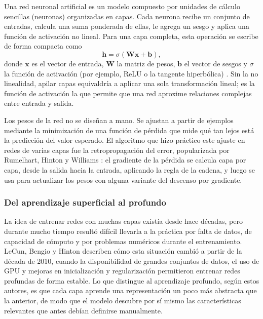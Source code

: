 Una red neuronal artificial es un modelo compuesto por unidades de cálculo sencillas (neuronas) organizadas en capas. Cada neurona recibe un conjunto de entradas, calcula una suma ponderada de ellas, le agrega un sesgo y aplica una función de activación no lineal. Para una capa completa, esta operación se escribe de forma compacta como
\begin{equation}
\mathbf{h} = \sigma(\mathbf{W}\mathbf{x} + \mathbf{b}),
\end{equation}
donde $\mathbf{x}$ es el vector de entrada, $\mathbf{W}$ la matriz de pesos, $\mathbf{b}$ el vector de sesgos y $\sigma$ la función de activación (por ejemplo, ReLU o la tangente hiperbólica) \cite{goodfellow2016deep}. Sin la no linealidad, apilar capas equivaldría a aplicar una sola transformación lineal; es la función de activación la que permite que una red aproxime relaciones complejas entre entrada y salida.

Los pesos de la red no se diseñan a mano. Se ajustan a partir de ejemplos mediante la minimización de una función de pérdida que mide qué tan lejos está la predicción del valor esperado. El algoritmo que hizo práctico este ajuste en redes de varias capas fue la retropropagación del error, popularizada por Rumelhart, Hinton y Williams \cite{rumelhart1986learning}: el gradiente de la pérdida se calcula capa por capa, desde la salida hacia la entrada, aplicando la regla de la cadena, y luego se usa para actualizar los pesos con alguna variante del descenso por gradiente.


\subsubsection{Del aprendizaje superficial al profundo}


La idea de entrenar redes con muchas capas existía desde hace décadas, pero durante mucho tiempo resultó difícil llevarla a la práctica por falta de datos, de capacidad de cómputo y por problemas numéricos durante el entrenamiento. LeCun, Bengio y Hinton \cite{lecun2015deep} describen cómo esta situación cambió a partir de la década de 2010, cuando la disponibilidad de grandes conjuntos de datos, el uso de GPU y mejoras en inicialización y regularización permitieron entrenar redes profundas de forma estable. Lo que distingue al aprendizaje profundo, según estos autores, es que cada capa aprende una representación un poco más abstracta que la anterior, de modo que el modelo descubre por sí mismo las características relevantes que antes debían definirse manualmente.

